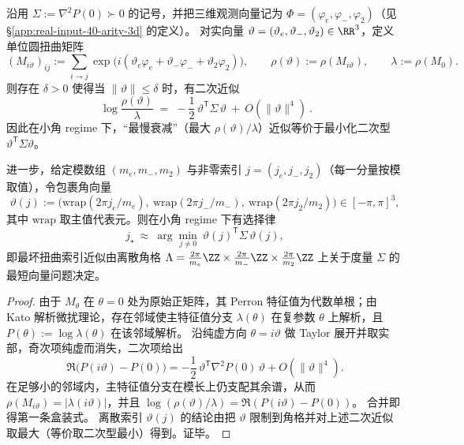 \begin{theorem}\label{thm:real-input-40-near-coboundary-svp}
沿用 \(\Sigma:=\nabla^2P(0)\succ 0\) 的记号，并把三维观测向量记为
\(
\Phi=(\varphi_e,\varphi_-,\varphi_2)
\)（见 \S\ref{app:real-input-40-arity-3d} 的定义）。
对实向量 \(\vartheta=(\vartheta_e,\vartheta_-,\vartheta_2)\in\RR^3\)，定义单位圆扭曲矩阵
\[
(M_{i\vartheta})_{ij}:=\sum_{i\to j}\exp\bigl(i(\vartheta_e\varphi_e+\vartheta_-\varphi_-+\vartheta_2\varphi_2)\bigr),
\qquad
\rho(\vartheta):=\rho(M_{i\vartheta}),
\qquad
\lambda:=\rho(M_0).
\]
则存在 \(\delta>0\) 使得当 \(\|\vartheta\|\le \delta\) 时，有二次近似
\[
\boxed{\ \log\frac{\rho(\vartheta)}{\lambda}
\;=\;
-\frac{1}{2}\,\vartheta^{\mathsf T}\Sigma\,\vartheta\ +\ O(\|\vartheta\|^4)\ }.
\]
因此在小角 regime 下，“最慢衰减”（最大 \(\rho(\vartheta)/\lambda\)）近似等价于最小化二次型 \(\vartheta^{\mathsf T}\Sigma\vartheta\)。
\par
进一步，给定模数组 \((m_e,m_-,m_2)\) 与非零索引 \(j=(j_e,j_-,j_2)\)（每一分量按模取值），令包裹角向量
\[
\vartheta(j):=\bigl(\mathrm{wrap}(2\pi j_e/m_e),\ \mathrm{wrap}(2\pi j_-/m_-),\ \mathrm{wrap}(2\pi j_2/m_2)\bigr)\in[-\pi,\pi]^3,
\]
其中 \(\mathrm{wrap}\) 取主值代表元。则在小角 regime 下有选择律
\[
j_\star\ \approx\ \arg\min_{j\neq 0}\ \vartheta(j)^{\mathsf T}\Sigma\,\vartheta(j),
\]
即最坏扭曲索引近似由离散角格
\(
\Lambda=\frac{2\pi}{m_e}\ZZ\times\frac{2\pi}{m_-}\ZZ\times\frac{2\pi}{m_2}\ZZ
\)
上关于度量 \(\Sigma\) 的最短向量问题决定。
\end{theorem}
\begin{proof}
由于 \(M_\theta\) 在 \(\theta=0\) 处为原始正矩阵，其 Perron 特征值为代数单根；由 Kato 解析微扰理论，存在邻域使主特征值分支 \(\lambda(\theta)\) 在复参数 \(\theta\) 上解析，且 \(P(\theta):=\log\lambda(\theta)\) 在该邻域解析。
沿纯虚方向 \(\theta=i\vartheta\) 做 Taylor 展开并取实部，奇次项纯虚而消失，二次项给出
\[
\Re\bigl(P(i\vartheta)-P(0)\bigr)=-\frac12\,\vartheta^{\mathsf T}\nabla^2P(0)\,\vartheta+O(\|\vartheta\|^4).
\]
在足够小的邻域内，主特征值分支在模长上仍支配其余谱，从而 \(\rho(M_{i\vartheta})=|\lambda(i\vartheta)|\)，并且
\(
\log(\rho(\vartheta)/\lambda)=\Re(P(i\vartheta)-P(0))
\)。
合并即得第一条盒装式。
离散索引 \(\vartheta(j)\) 的结论由把 \(\vartheta\) 限制到角格并对上述二次近似取最大（等价取二次型最小）得到。证毕。
\end{proof}


